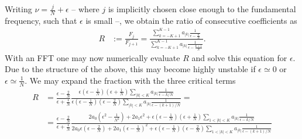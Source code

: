 \documentclass[english, parskip=full]{scrartcl}
\newcommand{\kla}{}
\begin{document}
Writing $\nu = \frac{j}{N} + \epsilon$ -- where $j$ is implicitly chosen close enough to the fundamental frequency, such that $\epsilon$ is small --, we obtain the ratio of consecutive coefficients as
\begin{align}
R &:= \frac{F_j}{F_{j+1}} = \frac{\sum_{k=-K+1}^{K-1} a_{|k|} \frac{1}{\epsilon - \frac{k}{N}}}{\sum_{k=-K+1}^{K-1} a_{|k|} \frac{1}{\epsilon - \frac{k+1}{N}}}.
\end{align}
With an FFT one may now numerically evaluate $R$ and solve this equation for $\epsilon$.
Due to the structure of the above, this may become highly unstable if $\epsilon\simeq 0$ or $\epsilon\simeq \frac{1}{N}$.
We may expand the fraction with the three critical terms
\begin{align}
R &= \frac{\epsilon - \frac{2}{N}}{\epsilon + \frac{1}{N}} \frac{\epsilon \kla\left( {\epsilon - \frac{1}{N}} \right)  \kla\left( {\epsilon + \frac{1}{N}} \right) \sum_{|k|<K} a_{|k|} \frac{1}{\epsilon - k/N} }{\epsilon \kla\left( {\epsilon - \frac{1}{N}} \right)  \kla\left( {\epsilon - \frac{2}{N}} \right) \sum_{|k|<K} a_{|k|} \frac{1}{\epsilon - (k+1)/N}} = \\
&= \frac{\epsilon - \frac{2}{N}}{\epsilon + \frac{1}{N}} \frac{2a_0 \kla\left( {\epsilon^2 - \frac{1}{N^2}} \right) + 2a_1 \epsilon^2 + \epsilon \kla\left( {\epsilon - \frac{1}{N}} \right)  \kla\left( {\epsilon + \frac{1}{N}} \right)\sum_{1<|k|<K} a_{|k|} \frac{1}{\epsilon - k/N}}{2a_0 \epsilon\kla\left( {\epsilon - \frac{2}{N}} \right) + 2a_1 \kla\left( {\epsilon - \frac{1}{N}} \right)^2 +  \epsilon \kla\left( {\epsilon - \frac{1}{N}} \right)  \kla\left( {\epsilon - \frac{2}{N}} \right) \sum_{1<|k|<K} a_{|k|} \frac{1}{\epsilon - (k+1)/N}}
\end{align}
\end{document}
